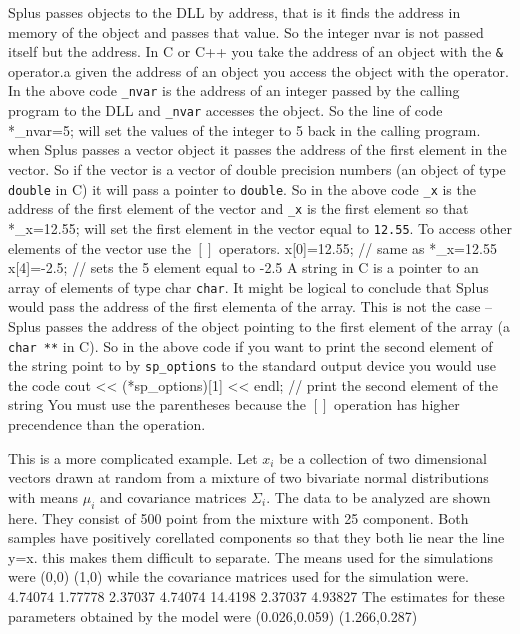 {{{{{{{{Splus passes objects to the DLL by address, that is it
finds the address in memory of the object and passes that value.
So the integer nvar is not passed itself but the address. In
C or C++ you take the address of an object with the {\tt \&}
operator.a given the address of an object you access the 
object with the {\tt *} operator. In the above code
{\tt \_nvar} is the address of an integer passed by 
the calling program to the DLL and {\tt *\_nvar}
accesses the object. So the line of code
\beginexample
  *_nvar=5;
\endexample
\noindent will set the values of the integer to 5 back in the calling 
program.
when Splus passes a vector object it passes the address of the
first element in the vector. So if the vector is a vector of
double precision numbers (an object of type {\tt double} in C)
it will pass a pointer to {\tt double}. So in the above code
{\tt \_x} is the address of the first element of the vector
and {\tt *\_x} is the first element so that
\beginexample
  *_x=12.55;
\endexample
will set the first element in the vector equal to {\tt 12.55}.
To access other  elements of the vector use the $[]$ operators.
\beginexample
  x[0]=12.55;  // same as *_x=12.55
  x[4]=-2.5;  // sets the 5 element equal to -2.5
\endexample
{}
A string in C is a  pointer to an array of elements of type char {\tt char}.
It might be logical to conclude that Splus would pass the
address of the first elementa of the array. This is not
the case -- Splus passes the address of the object pointing to the 
first element of the array (a {\tt char **} in C).
So in the above code if you want to print the second element of the
string point to by {\tt sp\_options} to the standard output
device you would use the code
\beginexample
  cout << (*sp_options)[1] << endl; // print the second element of the string
\endexample
You must use the parentheses because the $[]$ operation has
higher precendence than the {\tt *} operation.


This is a more complicated example.
Let $x_i$ be a collection of two dimensional vectors drawn  
at random from a mixture of two bivariate normal distributions with
means $\mu_i$ and covariance matrices $\Sigma_i$.
The data to be analyzed are shown here. They consist of 500
point from the mixture  with 25%
component. Both samples have positively corellated components so
that they both lie near the line y=x.
this makes them difficult to separate.
The means used for the simulations were
\beginexample
  (0,0)     (1,0)
\endexample
while the covariance matrices used for the simulation were.
 4.74074     1.77778 2.37037
 4.74074 14.4198     2.37037 4.93827
\endexample
The estimates for these parameters obtained by the model were
\beginexample
   (0.026,0.059)   (1.266,0.287)

}}}}}}}}
